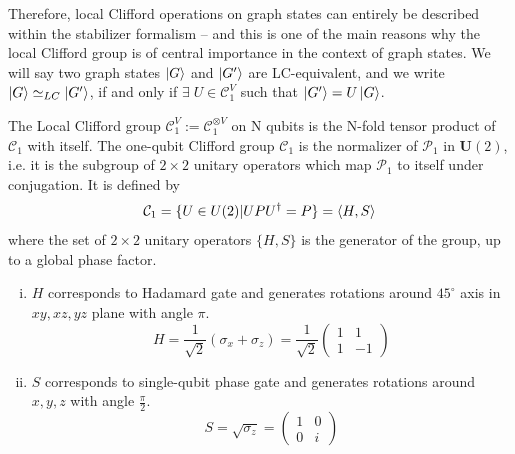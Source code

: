 \documentclass[10pt,a4paper]{book}
\numberwithin{equation}{chapter}
\numberwithin{figure}{chapter}
\numberwithin{table}{chapter}
\begin{document}
Therefore, local Clifford operations on graph states can entirely be described within the stabilizer formalism – and this is one of the main reasons why the local Clifford group is of central importance in the context of graph states. We will say two graph states $\ket{G}$ and $\ket{G'}$ are LC-equivalent, and we write $\ket{G}\simeq_{LC}\ket{G'}$, if and only if $\exists \; U \in \mathcal{C}^{V}_{1}$ such that $\ket{G'}=U\ket{G}$.
 
The Local Clifford group $\mathcal{C}^{V}_{1}:=\mathcal{C}^{\otimes V}_{1}$ on N qubits is the N-fold tensor product of $\mathcal{C}_{1}$ with itself. The one-qubit Clifford group $\mathcal{C}_1$ is the normalizer of $\mathcal{P}_1$ in $\textbf{U}(2)$, i.e. it is the subgroup of $2\times 2$ unitary operators which map $\mathcal{P}_1$ to itself under conjugation. It is defined by
\begin{equation}
\mathcal{C}_{1}=\lbrace U \in U(2)|UPU^{\dagger}=P\rbrace=\braket{H,S}
\end{equation}
where the set of $2\times 2$ unitary operators $\lbrace H,S \rbrace$ is the generator of the group, up to a global phase factor.
\begin{enumerate}[(i)]
\item $H$ corresponds to Hadamard gate and generates rotations around $45^{\circ}$ axis in $xy, xz, yz$ plane with angle $\pi$.
\begin{equation}
H=\frac{1}{\sqrt{2}}\left( \sigma_{x}+\sigma_{z}\right)=\frac{1}{\sqrt{2}}\left(\begin{array}{cc}1&1\\1&-1 \end{array}\right) 
\end{equation}
\item $S$ corresponds to single-qubit phase gate and generates rotations around $x,y,z$ with angle $\frac{\pi}{2}$.
\begin{equation}
S=\sqrt{\sigma_{z}}=\left(\begin{array}{cc}1&0\\0&i\end{array}\right) 
\end{equation}
\end{enumerate}
\end{document}
